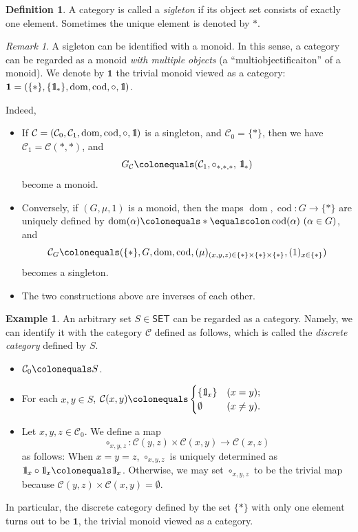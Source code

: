 \documentclass{surv-l}
\numberwithin{equation}{chapter}
\numberwithin{figure}{chapter}
\theoremstyle{plain}
\theoremstyle{definition}
\newtheorem{dfn}[thm]{Definition}
\newtheorem{exm}[thm]{Example}
\theoremstyle{remark}
\newtheorem{rmk}[thm]{Remark}
\newcommand{\id}{1\kern-.25em{\text{{\rm l}}}}
\DeclareMathOperator{\dom}{dom}
\DeclareMathOperator{\cod}{cod}
\begin{document}
\begin{dfn}
A category is called a \emph{sigleton} if its object set consists of exactly one element.
Sometimes the unique element is denoted by $*$.
\end{dfn}

\begin{rmk}\label{rmk:monoid-cat}
A sigleton can be identified with a monoid.
In this sense, a category can be regarded as a monoid
\emph{with multiple objects}
(a ``multiobjectificaiton'' of a monoid).
We denote by $\mathbf{1}$ the trivial monoid viewed as a category:
$\mathbf{1} = (\{*\}, \{\id_*\}, \dom, \cod, \circ, \id)$.

Indeed,
\begin{itemize}
\item
If ${\mathcal{C}} =({\mathcal{C}}_0, {\mathcal{C}}_1, \dom,\cod,\circ,\id)$ is a singleton, and
${\mathcal{C}}_0 = \{*\}$, then we have
${\mathcal{C}}_1={\mathcal{C}}(*,*)$, and
\[
G_{{\mathcal{C}}}\colonequals  ({\mathcal{C}}_1, \circ_{*,*,*},\, \id_{*})
\]
become a monoid.
\item
Conversely, if $(G, \mu, 1)$ is a monoid,
then the maps $\dom, \cod \colon G \to \{*\}$ are uniquely defined by
$\dom(\alpha) \colonequals * \equalscolon\cod(\alpha)\ (\alpha \in G)$, and
\[
{\mathcal{C}}_G\colonequals 
(\{*\}, G, \dom, \cod, (\mu)_{(x,y,z) \in \{*\}\times\{*\}\times\{*\}}, (1)_{x\in  \{*\}})
\]
becomes a singleton.
\item
The two constructions above are inverses of each other.
\end{itemize}
\end{rmk}

\begin{exm}\label{exm:risanken}
An arbitrary set $S \in \mathsf{SET}$ can be regarded as a category.
Namely, we can identify it with the category ${\mathcal{C}}$ defined as follows,
which is called the \emph{discrete category} defined by $S$.
\begin{itemize}
\item
${\mathcal{C}}_0\colonequals  S$.
\item
For each $x, y \in S$,
${\mathcal{C}}(x, y)\colonequals  \begin{cases}
\{\id_x\} &(x = y);\\
\emptyset &(x \ne y).
\end{cases}
$
\item
Let $x,y,z \in {\mathcal{C}}_0$.  We define a map
\[
\circ_{x,y,z}\colon {\mathcal{C}}(y,z) \times {\mathcal{C}}(x,y) \to {\mathcal{C}}(x, z)
\]
as follows:
When $x=y=z$, $\circ_{x,y,z}$ is uniquely determined as
$\id_x \circ \id_x \colonequals  \id_x$.
Otherwise, we may set $\circ_{x,y,z}$ to be the trivial map because
${\mathcal{C}}(y,z) \times {\mathcal{C}}(x,y) = \emptyset$.
\end{itemize}
In particular, the discrete category defined by the set $\{*\}$ with only one element
turns out to be $\mathbf{1}$, the trivial monoid viewed as a category.
\end{exm}
\end{document}
